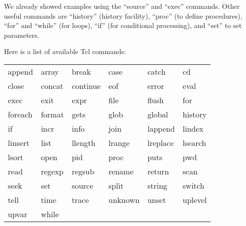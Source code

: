 \documentclass[12pt]{article}
\begin{document}
We already showed examples using the ``source'' and ``exec''
commands. Other useful commands are ``history'' (history facility),
``proc'' (to define procedures), ``for'' and ``while'' (for loops),
``if'' (for conditional processing), and ``set'' to set parameters.

Here is a list of available Tcl commands:

\vspace*{0.3cm}
\begin{tabular}{llllll}
append  & array    & break    & case    & catch    & cd       \\
close   & concat   & continue & eof     & error    & eval     \\
exec    & exit     & expr     & file    & flush    & for      \\
foreach & format   & gets     & glob    & global   & history  \\
if      & incr     & info     & join    & lappend  & lindex   \\
linsert & list     & llength  & lrange  & lreplace & lsearch \\
lsort   & open     & pid      & proc    & puts     & pwd     \\
read    & regexp   & regsub   & rename  & return   & scan    \\
seek    & set      & source   & split   & string   & switch  \\
tell    & time     & trace    & unknown & unset    & uplevel \\
upvar   & while    &          &         &          &         \\
\end{tabular}
\end{document}
